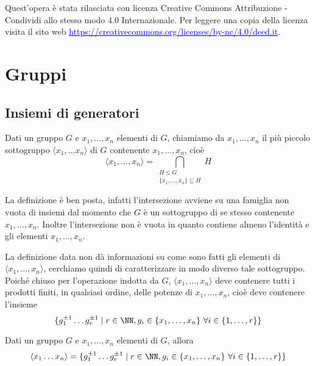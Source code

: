 \documentclass[11pt]{scrartcl}
\begin{document}
Quest'opera è stata rilasciata con licenza Creative Commons Attribuzione - Condividi allo stesso modo 4.0 Internazionale. Per leggere
una copia della licenza visita il sito web \href{http://creativecommons.org/licenses/by-sa/4.0/deed.it}{\textcolor{blue}{https://creativecommons.org/licenses/by-nc/4.0/deed.it}}.\\

\newpage

\section{Gruppi}

\subsection{Insiemi di generatori}

\begin{definition}
    Dati un gruppo $G$ e $x_1, \ldots, x_n$ elementi di $G$, chiamiamo  da $x_1, \ldots, x_n$ il più piccolo sottogruppo $\langle x_1, \ldots x_n
    \rangle$ di $G$ contenente $x_1, \ldots, x_n$, cioè \[\langle x_1, \ldots, x_n\rangle =
    \bigcap_{\substack{H\leqslant G\\ \{x_1, \ldots, x_n\} \subseteq H}} H\] 
\end{definition}

\begin{remark}
    La definizione è ben posta, infatti l'intersezione avviene su una 
    famiglia non vuota di insiemi dal momento che $G$ è un sottogruppo di 
    se stesso contenente $x_1, \ldots, x_n$. Inoltre l'intersezione non è vuota in 
    quanto contiene almeno l'identità e gli elementi $x_1, \ldots, x_n$.
\end{remark}

La definizione data non dà informazioni su come sono fatti gli elementi di 
$\langle x_1, \ldots, x_n\rangle$, cerchiamo quindi di caratterizzare in modo
diverso tale sottogruppo. Poiché chiuso per l'operazione indotta da $G$, $\langle x_1, \ldots, x_n\rangle$
deve contenere tutti i prodotti finiti, in qualsiasi ordine, delle potenze di
$x_1, \ldots, x_n$, cioè deve contenere l'insieme 
\[\{g_1^{\pm 1} \ldots g_r^{\pm 1}\mid r \in \NN, g_i \in \{x_1, \ldots, x_n\}
~\forall i \in \{1, \ldots, r\}\}\]

\begin{proposition}
Dati un gruppo $G$ e $x_1, \ldots, x_n$ elementi di $G$, allora \[
    \langle x_1 \ldots x_n\rangle = \{g_1^{\pm 1} \ldots g_r^{\pm 1}\mid r 
    \in \NN, g_i \in \{x_1, \ldots, x_n\}~\forall i \in \{1, \ldots, r\}\}
    \]
\end{proposition}
\end{document}
